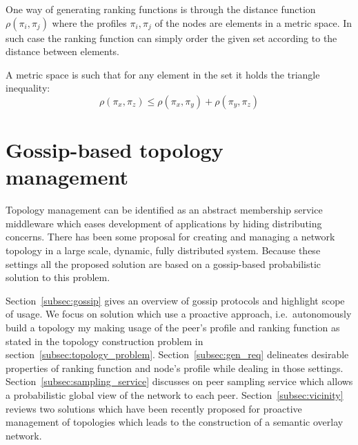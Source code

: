 One way of generating ranking functions is through the distance function $\rho(\pi_i,\pi_j)$ where the profiles $\pi_i, \pi_j$ of the nodes are elements in a metric space. In such case the ranking function can simply order the given set according to the distance between elements. 

A metric space is such that for any element in the set it holds the triangle inequality:
\begin{equation}
 \rho(\pi_x,\pi_z) \leq \rho(\pi_x,\pi_y) + \rho(\pi_y,\pi_z)
\label{eq:triangle_inequality}
\end{equation}

\section{\label{sec:gossip_topology}Gossip-based topology management}
Topology management can be identified as an abstract membership service middleware which eases development of applications by hiding distributing concerns. There has been some proposal for creating and managing a network topology in a large scale, dynamic, fully distributed system. Because these settings all the proposed solution are based on a gossip-based probabilistic solution to this problem.

Section~\ref{subsec:gossip} gives an overview of gossip protocols and highlight scope of usage. We focus on solution which use a proactive approach, i.e.\ autonomously build a topology my making usage of the peer's profile and ranking function as stated in the topology construction problem in section~\ref{subsec:topology_problem}. Section~\ref{subsec:gen_req} delineates desirable properties of ranking function and node's profile while dealing in those settings. Section~\ref{subsec:sampling_service} discusses on peer sampling service which allows a probabilistic global view of the network to each peer. Section~\ref{subsec:vicinity} reviews two solutions which have been recently proposed for proactive management of topologies which leads to the construction of a semantic overlay network.



